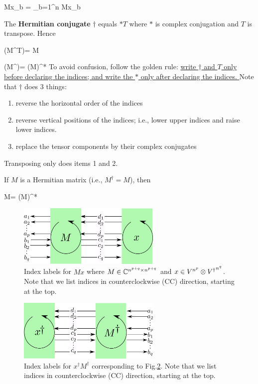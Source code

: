 \beq
Mx_b = \sum_{b=1}^n
Mx_b
\eeq



The {\bf Hermitian conjugate} $\dagger$
equals $*T$ where $*$ is complex conjugation and $T$ is transpose.
Hence

\beq
(M^T)= M
\eeq

\beq
(M^\dagger)= (M)^*
\eeq
To avoid confusion,
follow the golden rule: \ul{write 
$\dagger$ and $T$ only before
declaring the indices; and write 
the $*$ only after declaring the
indices.
}
Note that $\dagger$
does 3 things: 
\begin{enumerate} \item reverse the horizontal order of the indices \item
reverse vertical positions
of the indices; i.e., 
lower upper indices and raise lower indices.

\item replace the tensor components
by their complex conjugates
\end{enumerate}
Transposing only does
items 1 and 2.


If $M$ is a Hermitian matrix (i.e., $M^\dagger =M$), then

\beq
M= (M)^*
\eeq



\begin{figure}[h!]
\centering
\includegraphics[width=2.7in]
{conventions/index-labels-Mx.png}
\caption{Index labels for $Mx$
where $M
\in { \mathbb{C}}^{n^{p+q}\times n^{p+q}}$ and
$x\in V^{n^p}\otimes {V^\dagger}^{n^q}$.
Note that we  list indices in counterclockwise (CC) direction, 
starting at the top.}
\label{fig-index-labels-Mx}
\end{figure}

\begin{figure}[h!]
\centering
\includegraphics[width=2.7in]
{conventions/index-labels-hermitian.png}
\caption{Index labels for $x^\dagger M^\dagger$
corresponding to Fig.\ref{fig-index-labels-hermitian}.
Note that we  list indices in counterclockwise (CC) direction, 
starting at the top. }
\label{fig-index-labels-hermitian}
\end{figure}


